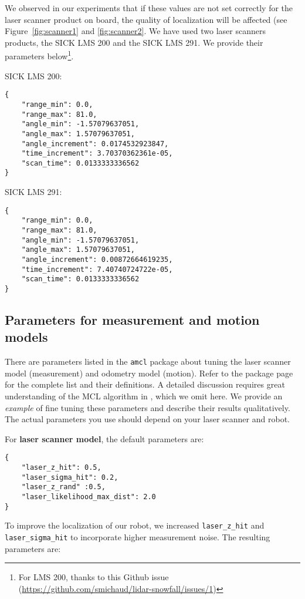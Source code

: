 \documentclass[12pt]{article}
\begin{document}
We observed in our experiments that if these values are not set correctly for the laser scanner product on board, the quality of localization will be affected (see Figure~\ref{fig:scanner1} and \ref{fig:scanner2}. We have used two laser scanners products, the SICK LMS 200 and the SICK LMS 291. We provide their parameters below\footnote{For LMS 200, thanks to {this Github issue} (\url{https://github.com/smichaud/lidar-snowfall/issues/1})}.

\noindent SICK LMS 200:
\lstset{language=json}
\begin{lstlisting}
{   
    "range_min": 0.0,
    "range_max": 81.0,
    "angle_min": -1.57079637051,
    "angle_max": 1.57079637051,
    "angle_increment": 0.0174532923847,
    "time_increment": 3.70370362361e-05,
    "scan_time": 0.0133333336562
}
\end{lstlisting}

\noindent SICK LMS 291:
\lstset{language=json}
\begin{lstlisting}
{   
    "range_min": 0.0,
    "range_max": 81.0,
    "angle_min": -1.57079637051,
    "angle_max": 1.57079637051,
    "angle_increment": 0.00872664619235,
    "time_increment": 7.40740724722e-05,
    "scan_time": 0.0133333336562
}
\end{lstlisting}


\subsection{Parameters for measurement and motion models}
There are parameters listed in the \texttt{amcl} package about tuning the laser scanner model (measurement)  and odometry model (motion). Refer to the package page for the complete list and their definitions. A detailed discussion requires great understanding of the MCL algorithm in \cite{thrun2005probabilistic}, which we omit here. We provide an \emph{example} of fine tuning these parameters and describe their results qualitatively. The actual parameters you use should depend on your laser scanner and robot.

For \textbf{laser scanner model}, the default parameters are:

\lstset{language=json}
\begin{lstlisting}
{
    "laser_z_hit": 0.5,
    "laser_sigma_hit": 0.2,
    "laser_z_rand" :0.5,
    "laser_likelihood_max_dist": 2.0
}
\end{lstlisting}

To improve the localization of our robot, we increased \texttt{laser\_z\_hit} and \texttt{laser\_sigma\_hit} to incorporate higher measurement noise. The resulting parameters are:
\end{document}
